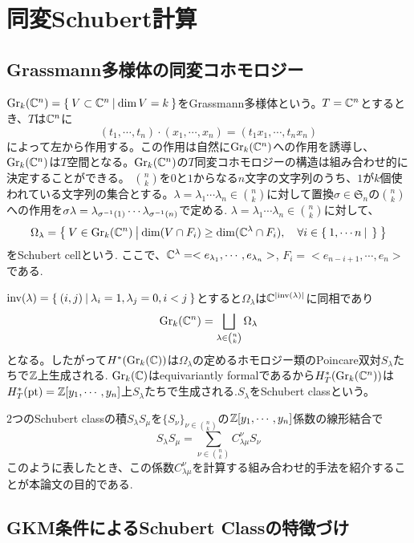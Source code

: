 \section{同変Schubert計算}
\subsection{Grassmann多様体の同変コホモロジー}
$\text{Gr}_k(\mathbb{C}^n)=\left\{\:V\subset \mathbb{C}^n\:\middle|\:\dim V = k\:\right\}$をGrassmann多様体という。$T=\mathbb{C}^n$とするとき、$T$は$\mathbb{C}^n$に
\[
(t_1,\cdots,t_n)\cdot(x_1,\cdots,x_n)=(t_1x_1,\cdots,t_nx_n)
\]
によって左から作用する。この作用は自然に$\text{Gr}_k(\mathbb{C}^n)$への作用を誘導し、$\text{Gr}_k(\mathbb{C}^n)$は$T$空間となる。$\text{Gr}_k(\mathbb{C}^n)$の$T$同変コホモロジーの構造は組み合わせ的に決定することができる。
$\binom{n}{k}$を$0$と$1$からなる$n$文字の文字列のうち、$1$が$k$個使われている文字列の集合とする。$\lambda=\lambda_1\cdots \lambda_n\in\binom{n}{k}$に対して置換$\sigma\in\mathfrak{S}_n$の$\binom{n}{k}$への作用を$\sigma\lambda=\lambda_{\sigma^{-1}(1)}\cdots\lambda_{\sigma^{-1}(n)}$で定める.
$\lambda=\lambda_1\cdots \lambda_n\in\binom{n}{k}$に対して、
\[
\Omega_\lambda=\left\{\:V\in \text{Gr}_k(\mathbb{C}^n)\:\middle|\:\dim(V\cap F_i)\geq \dim(\mathbb{C}^\lambda\cap F_i),\quad \forall i\in \left\{\:1,\cdots n\:\middle|\:\:\right\}\:\right\}
\]
をSchubert cellという. ここで、$\mathbb{C}^\lambda=<e_{\lambda_1},\cdots,e_{\lambda_n}>$, $F_i=<e_{n-i+1},\cdots,e_n>$である. 

$\text{inv}(\lambda)=\left\{\:(i,j)\:\middle|\:\lambda_i=1, \lambda_j=0, i<j\:\right\}$とすると$\Omega_\lambda$は$\mathbb{C}^{|\text{inv}(\lambda)|}$に同相であり
\[
\text{Gr}_k(\mathbb{C}^n)=\bigsqcup_{\lambda\in\binom{n}{k}}\Omega_\lambda
\]
となる。したがって$H^*(\text{Gr}_k(\mathbb{C}))$は$\Omega_\lambda$の定めるホモロジー類のPoincare双対$S_\lambda$たちで$\mathbb{Z}$上生成される. $\text{Gr}_k(\mathbb{C})$はequivariantly formalであるから$H^*_T(\text{Gr}_k(\mathbb{C}^n))$は$H^*_T(\text{pt})=\mathbb{Z}[y_1,\cdots,y_n]$上$S_\lambda$たちで生成される.$S_\lambda$をSchubert classという。

$2$つのSchubert classの積$S_\lambda S_\mu$を$\{S_\nu\}_{\nu\in\binom{n}{k}}$の$\mathbb{Z}[y_1,\cdots,y_n]$係数の線形結合で
\[
S_\lambda S_\mu=\sum_{\nu\in\binom{n}{k}}C^\nu_{\lambda\mu}S_\nu
\]
このように表したとき、この係数$C^{\nu}_{\lambda\mu}$を計算する組み合わせ的手法を紹介することが本論文の目的である.


\subsection{GKM条件によるSchubert Classの特徴づけ}

